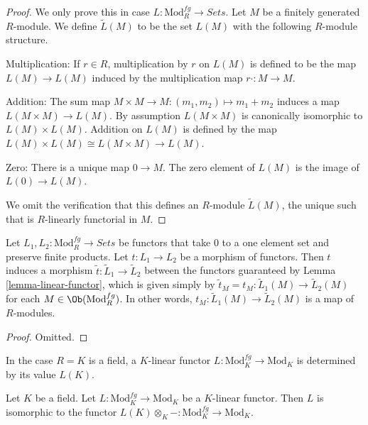 \begin{proof}
We only prove this in case $L: \text{Mod}^{fg}_R \to \textit{Sets}$.
Let $M$ be a finitely generated $R$-module. We define $\widetilde{L}(M)$ to be
the set $L(M)$ with the following $R$-module structure.

\medskip\noindent
Multiplication: If $r \in R$, multiplication by $r$ on $L(M)$ is defined to be
the map $L(M) \to L(M)$ induced by the multiplication map
$r \cdot: M \to M$.

\medskip\noindent
Addition: The sum map $M \times M \to M: (m_1, m_2) \mapsto m_1 + m_2$
induces a map $L(M \times M) \to L(M)$. By assumption $L(M \times M)$
is canonically isomorphic to $L(M) \times L(M)$.  Addition on $L(M)$ is defined
by the map $L(M) \times L(M) \cong L(M \times M) \to L(M)$.

\medskip\noindent
Zero: There is a unique map $0 \to M$. The zero element of $L(M)$ is
the image of $L(0) \to L(M)$.

\medskip\noindent
We omit the verification that this defines an $R$-module $\widetilde{L}(M)$,
the unique such that is $R$-linearly functorial in $M$.
\end{proof}

\begin{lemma}
\label{lemma-morphism-linear-functors}
Let $L_1, L_2: \text{Mod}^{fg}_R \to \textit{Sets}$ be
functors that take $0$ to a one element set and preserve finite products.
Let $t : L_1 \to L_2$ be a morphism of functors. Then $t$ induces a morphism
$\widetilde{t} : \widetilde{L}_1 \to \widetilde{L}_2$ between the
functors guaranteed by Lemma \ref{lemma-linear-functor}, which is given simply
by $\widetilde{t}_M = t_M: \widetilde{L}_1(M) \to \widetilde{L}_2(M)$
for each $M \in \Ob(\text{Mod}^{fg}_R)$. In other words,
$t_M: \widetilde{L}_1(M) \to \widetilde{L}_2(M)$ is a map of $R$-modules.
\end{lemma}

\begin{proof}
Omitted.
\end{proof}

\noindent
In the case $R = K$ is a field, a $K$-linear functor
$L : \text{Mod}^{fg}_K \to \text{Mod}_K$ is determined by its value $L(K)$.

\begin{lemma}
\label{lemma-linear-functor-over-field}
Let $K$ be a field. Let $L: \text{Mod}^{fg}_K \to
\text{Mod}_K$ be a $K$-linear functor.  Then $L$ is isomorphic to the
functor $L(K) \otimes_K - : \text{Mod}^{fg}_K \to
\text{Mod}_K$.
\end{lemma}

